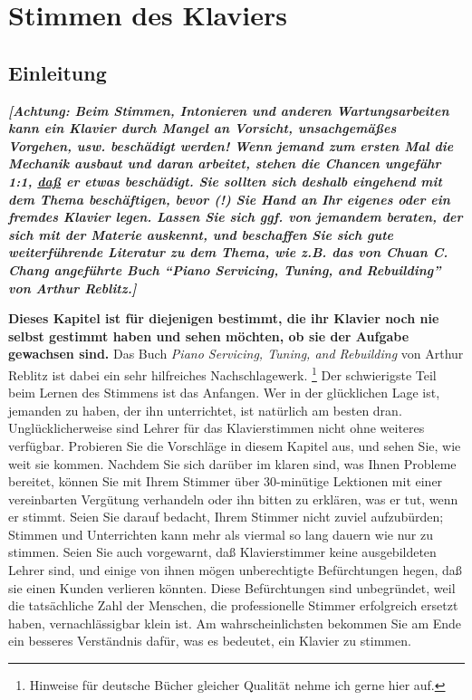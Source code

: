 \hypertarget{c2}{}

\chapter{Stimmen des Klaviers}\hypertarget{c2_1}{}

\section{Einleitung}

\textbf{\textit{{\normalsize [Achtung: Beim Stimmen, Intonieren und anderen Wartungsarbeiten kann ein Klavier durch Mangel an Vorsicht, unsachgemäßes Vorgehen, usw. beschädigt werden!
 Wenn jemand zum ersten Mal die Mechanik ausbaut und daran arbeitet, stehen die Chancen ungefähr 1:1, \underline{daß}  er etwas beschädigt.
 Sie sollten sich deshalb eingehend mit dem Thema beschäftigen, bevor (!) Sie Hand an Ihr eigenes oder ein fremdes Klavier legen.
 Lassen Sie sich ggf. von jemandem beraten, der sich mit der Materie auskennt, und beschaffen Sie sich gute weiterführende Literatur zu dem Thema, wie z.B. das von Chuan C. Chang angeführte Buch \enquote{Piano Servicing, Tuning, and Rebuilding} von Arthur Reblitz.]}}}

\textbf{Dieses Kapitel ist für diejenigen bestimmt, die ihr Klavier noch nie selbst gestimmt haben und sehen möchten, ob sie der Aufgabe gewachsen sind.}
 Das Buch \textit{Piano Servicing, Tuning, and Rebuilding} von Arthur Reblitz ist dabei ein sehr hilfreiches Nachschlagewerk.
 \footnote{Hinweise für deutsche Bücher gleicher Qualität nehme ich gerne hier auf.}
 Der schwierigste Teil beim Lernen des Stimmens ist das Anfangen.
 Wer in der glücklichen Lage ist, jemanden zu haben, der ihn unterrichtet, ist natürlich am besten dran.
 Unglücklicherweise sind Lehrer für das Klavierstimmen nicht ohne weiteres verfügbar.
 Probieren Sie die Vorschläge in diesem Kapitel aus, und sehen Sie, wie weit sie kommen.
 Nachdem Sie sich darüber im klaren sind, was Ihnen Probleme bereitet, können Sie mit Ihrem Stimmer über 30-minütige Lektionen mit einer vereinbarten Vergütung verhandeln oder ihn bitten zu erklären, was er tut, wenn er stimmt.
 Seien Sie darauf bedacht, Ihrem Stimmer nicht zuviel aufzubürden; Stimmen und Unterrichten kann mehr als viermal so lang dauern wie nur zu stimmen.
 Seien Sie auch vorgewarnt, daß Klavierstimmer keine ausgebildeten Lehrer sind, und einige von ihnen mögen unberechtigte Befürchtungen hegen, daß sie einen Kunden verlieren könnten.
 Diese Befürchtungen sind unbegründet, weil die tatsächliche Zahl der Menschen, die professionelle Stimmer erfolgreich ersetzt haben, vernachlässigbar klein ist.
 Am wahrscheinlichsten bekommen Sie am Ende ein besseres Verständnis dafür, was es bedeutet, ein Klavier zu stimmen.
 

